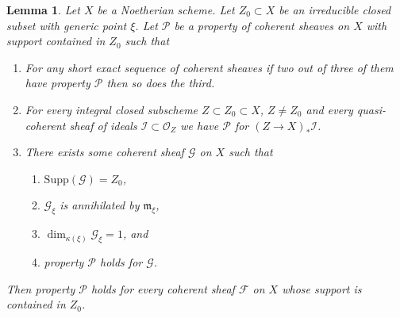 \documentclass{stacks-project}
\theoremstyle{plain}
\newtheorem{lemma}[subsection]{Lemma}
\theoremstyle{definition}
\theoremstyle{remark}
\numberwithin{equation}{subsection}
\begin{document}
\begin{lemma}
\label{lemma-property-irreducible}
Let $X$ be a Noetherian scheme. Let $Z_0 \subset X$ be an irreducible closed
subset with generic point $\xi$. Let $\mathcal{P}$ be a property of coherent
sheaves on $X$ with support contained in $Z_0$ such that
\begin{enumerate}
\item For any short exact sequence of coherent sheaves if two
out of three of them have property $\mathcal{P}$ then so does the
third.
\item For every integral closed subscheme $Z \subset Z_0 \subset X$,
$Z \not = Z_0$ and every quasi-coherent sheaf of ideals
$\mathcal{I} \subset \mathcal{O}_Z$ we have
$\mathcal{P}$ for $(Z \to X)_*\mathcal{I}$.
\item There exists some coherent sheaf $\mathcal{G}$ on $X$ such that
\begin{enumerate}
\item $\text{Supp}(\mathcal{G}) = Z_0$,
\item $\mathcal{G}_\xi$ is annihilated by $\mathfrak m_\xi$,
\item $\dim_{\kappa(\xi)} \mathcal{G}_\xi = 1$, and
\item property $\mathcal{P}$ holds for $\mathcal{G}$.
\end{enumerate}
\end{enumerate}
Then property $\mathcal{P}$ holds for every coherent sheaf
$\mathcal{F}$ on $X$ whose support is contained in $Z_0$.
\end{lemma}
\end{document}
